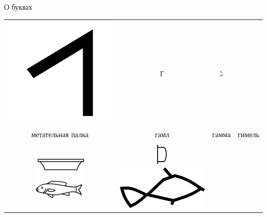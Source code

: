 \documentclass[aspectratio=169]{beamer}
\begin{document}
\begin{frame}[fragile]{О буквах}
\begin{center}
\begin{tabular}{c|c|c|c}
    \includegraphics[scale=0.01]{pics/lection-14-ph-gimel} & \Large Г & \Large $\gimel$\\
 метательная палка & гамл & гамма & гимель\\&&&\\
\includegraphics[scale=0.25]{pics/lection-14-door}
    \includegraphics[scale=0.25]{pics/lection-14-fish} &
    \includegraphics[scale=0.3]{pics/lection-14-ph-daleth-proto}
    \includegraphics[scale=0.01]{pics/lection-14-ph-dag}

\end{tabular}
\end{center}
\end{frame}
\end{document}
